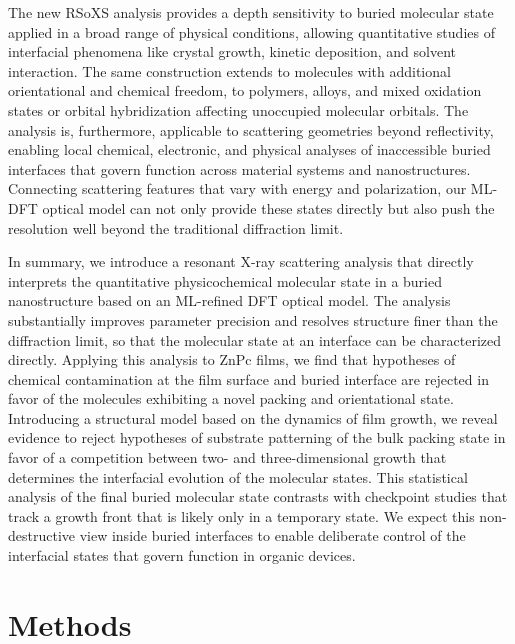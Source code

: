 The new RSoXS analysis provides a depth sensitivity to buried molecular state applied in a broad range of physical conditions, allowing quantitative studies of interfacial phenomena like crystal growth, kinetic deposition, and solvent interaction. The same construction extends to molecules with additional orientational and chemical freedom, to polymers, alloys, and mixed oxidation states or orbital hybridization affecting unoccupied molecular orbitals. The analysis is, furthermore, applicable to scattering geometries beyond reflectivity, enabling local chemical, electronic, and physical analyses of inaccessible buried interfaces that govern function across material systems and nanostructures. Connecting scattering features that vary with energy and polarization, our ML-DFT optical model can not only provide these states directly but also push the resolution well beyond the traditional diffraction limit.

In summary, we introduce a resonant X-ray scattering analysis that directly interprets the quantitative physicochemical molecular state in a buried nanostructure based on an ML-refined DFT optical model. The analysis substantially improves parameter precision and resolves structure finer than the diffraction limit, so that the molecular state at an interface can be characterized directly. Applying this analysis to ZnPc films, we find that hypotheses of chemical contamination at the film surface and buried interface are rejected in favor of the molecules exhibiting a novel packing and orientational state. Introducing a structural model based on the dynamics of film growth, we reveal evidence to reject hypotheses of substrate patterning of the bulk packing state in favor of a competition between two- and three-dimensional growth that determines the interfacial evolution of the molecular states. This statistical analysis of the final buried molecular state contrasts with checkpoint studies that track a growth front that is likely only in a temporary state. We expect this non-destructive view inside buried interfaces to enable deliberate control of the interfacial states that govern function in organic devices.

\section{Methods}\label{sec:methods}


